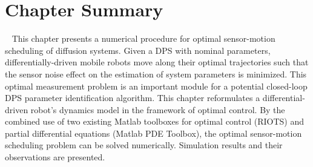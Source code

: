 
\section{Chapter Summary}~\label{s:con}
    This chapter presents a numerical procedure for optimal sensor-motion scheduling of diffusion systems.  Given a DPS with nominal parameters, differentially-driven mobile robots move along their optimal trajectories such that the  sensor noise effect on the estimation  of system parameters  is minimized. This optimal measurement problem is an important module for a potential closed-loop DPS parameter identification algorithm.     This chapter reformulates a differential-driven robot's dynamics model in the framework of optimal control. By the combined use of two existing Matlab toolboxes for  optimal control (RIOTS) and partial differential equations (Matlab PDE Toolbox),    the optimal sensor-motion scheduling problem can be solved numerically. Simulation results and their observations are presented.

